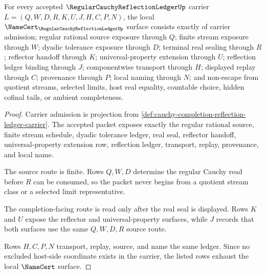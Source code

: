 \begin{theorem}
\label{thm:cauchy-completion-reflection-ledger-namecert-obligations}
For every accepted $\RegularCauchyReflectionLedgerUp$ carrier $L=(Q,W,D,R,K,U,J,H,C,P,N)$, the local $\NameCert_{\RegularCauchyReflectionLedgerUp}$ surface consists exactly of carrier admission; regular rational source exposure through $Q$; finite stream exposure through $W$; dyadic tolerance exposure through $D$; terminal real sealing through $R$; reflector handoff through $K$; universal-property extension through $U$; reflection ledger binding through $J$; componentwise transport through $H$; displayed replay through $C$; provenance through $P$; local naming through $N$; and non-escape from quotient streams, selected limits, host real equality, countable choice, hidden cofinal tails, or ambient completeness.
\end{theorem}
\begin{proof}
Carrier admission is projection from \autoref{def:cauchy-completion-reflection-ledger-carrier}. The accepted packet exposes exactly the regular rational source, finite stream schedule, dyadic tolerance ledger, real seal, reflector handoff, universal-property extension row, reflection ledger, transport, replay, provenance, and local name.

The source route is finite. Rows $Q,W,D$ determine the regular Cauchy read before $R$ can be consumed, so the packet never begins from a quotient stream class or a selected limit representative.

The completion-facing route is read only after the real seal is displayed. Rows $K$ and $U$ expose the reflector and universal-property surfaces, while $J$ records that both surfaces use the same $Q,W,D,R$ source route.

Rows $H,C,P,N$ transport, replay, source, and name the same ledger. Since no excluded host-side coordinate exists in the carrier, the listed rows exhaust the local $\NameCert$ surface.
\end{proof}

